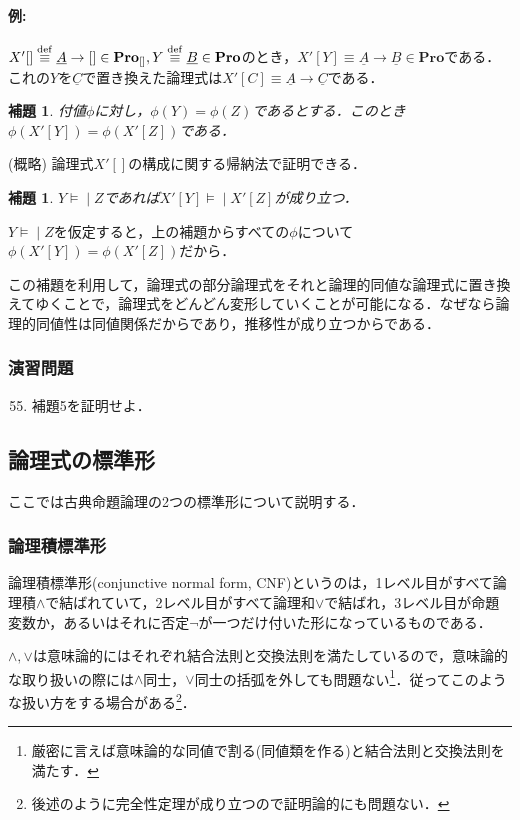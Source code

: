 \documentclass{ltjsarticle}
\makeatletter
\theoremstyle{mystyle1}
\theoremstyle{mystyle3}
\newtheorem{lem}[cor]{補題}
\theoremstyle{mystyle2}
\renewenvironment{proof}[1][\proofname]{\par
  \pushQED{\qed}%
  \normalfont
  \topsep6\p@\@plus6\p@ \trivlist
  \item[\hskip\labelsep{\bfseries\sffamily #1}]\ignorespaces
}{%
  \popQED\endtrivlist\@endpefalse
}
\renewcommand\proofname{証明:}
\newcommand{\uA}{\underline{A}}
\newcommand{\uB}{\underline{B}}
\newcommand{\uC}{\underline{C}}
\newcommand{\bPro}{\ensuremath{\mathbf{Pro}}}
\newcommand{\dequiv}{\ensuremath{\stackrel{\rm{def}}{\equiv}}}
\newcommand{\lequiv}{\ensuremath{\models\!\mid}}
\newcommand{\red}[1]{{\color{red} #1}}
\makeatother
\begin{document}
\paragraph{例:}
$X'[]\dequiv\uA\to[]\in\bPro_{[]},Y \dequiv\uB\in\bPro$のとき，$X'[Y] \equiv \uA \to \uB\in\bPro$である．これの$Y$を$\uC$で置き換えた論理式は$X'[C] \equiv\uA\to\uC$である．

\begin{lem}
  付値$\phi$に対し，$\phi(Y) = \phi(Z)$であるとする．このとき$\phi(X'[Y]) = \phi(X'[Z])$である．
\end{lem}
\begin{proof}
  (概略) 論理式$X'[]$の構成に関する帰納法で証明できる．
\end{proof}
\begin{lem}
  $Y\lequiv Z$であれば$X'[Y] \lequiv X'[Z]$が成り立つ．
\end{lem}
\begin{proof}
  $Y\lequiv Z$を仮定すると，上の補題からすべての$\phi$について$\phi(X'[Y]) = \phi(X'[Z])$だから．
\end{proof}

この補題を利用して，論理式の部分論理式をそれと論理的同値な論理式に置き換えてゆくことで，論理式をどんどん変形していくことが可能になる．なぜなら論理的同値性は同値関係だからであり，推移性が成り立つからである．
\subsubsection*{演習問題}
\begin{enumerate}
  \setcounter{enumi}{54}
  \item 補題5を証明せよ．
\end{enumerate}
\subsection{論理式の標準形}
ここでは古典命題論理の2つの標準形について説明する．
\subsubsection{論理積標準形}
\red{論理積標準形}(conjunctive normal form, CNF)というのは，1レベル目がすべて論理積$\wedge$で結ばれていて，2レベル目がすべて論理和$\vee$で結ばれ，3レベル目が命題変数か，あるいはそれに否定$\neg$が一つだけ付いた形になっているものである．

$\wedge, \vee$は意味論的にはそれぞれ結合法則と交換法則を満たしているので，意味論的な取り扱いの際には$\wedge$同士，$\vee$同士の括弧を外しても問題ない\footnote{厳密に言えば意味論的な同値で割る(同値類を作る)と結合法則と交換法則を満たす．}．従ってこのような扱い方をする場合がある\footnote{後述のように完全性定理が成り立つので証明論的にも問題ない．}．
\end{document}
